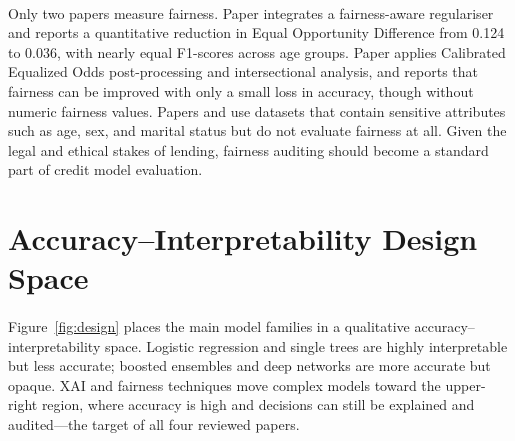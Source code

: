 \documentclass[12pt,a4paper,final]{extreport}
\begin{document}
\paragraph{} Only two papers measure fairness. Paper \cite{p1} integrates a fairness-aware regulariser and reports a quantitative reduction in Equal Opportunity Difference from 0.124 to 0.036, with nearly equal F1-scores across age groups. Paper \cite{p4} applies Calibrated Equalized Odds post-processing and intersectional analysis, and reports that fairness can be improved with only a small loss in accuracy, though without numeric fairness values. Papers \cite{p2} and \cite{p3} use datasets that contain sensitive attributes such as age, sex, and marital status but do not evaluate fairness at all. Given the legal and ethical stakes of lending, fairness auditing should become a standard part of credit model evaluation.

\section{Accuracy--Interpretability Design Space}

\paragraph{} Figure~\ref{fig:design} places the main model families in a qualitative accuracy--interpretability space. Logistic regression and single trees are highly interpretable but less accurate; boosted ensembles and deep networks are more accurate but opaque. XAI and fairness techniques move complex models toward the upper-right region, where accuracy is high and decisions can still be explained and audited---the target of all four reviewed papers.
\end{document}
